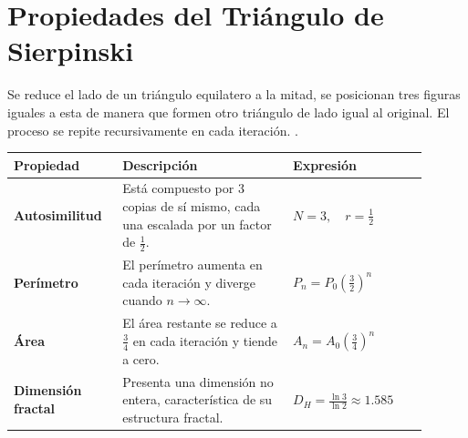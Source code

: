 \section{Propiedades del Triángulo de Sierpinski}

Se reduce el lado de un triángulo equilatero a la mitad, se posicionan tres figuras iguales a esta de manera que formen otro triángulo de lado igual al original. El proceso se repite recursivamente en cada iteración. \cite{Gustavo}.


\begin{center}
\renewcommand{\arraystretch}{1.5}
\begin{tabular}{p{0.22\linewidth} p{0.38\linewidth} p{0.30\linewidth}}
\hline
\textbf{Propiedad} & \textbf{Descripción} & \textbf{Expresión} \\
\hline

\textbf{Autosimilitud} &
Está compuesto por $3$ copias de sí mismo, cada una escalada por un factor de $\frac{1}{2}$. &
$N=3,\quad r=\frac{1}{2}$ \\

\textbf{Perímetro} &
El perímetro aumenta en cada iteración y diverge cuando $n\rightarrow\infty$. &
$P_n=P_0\left(\frac{3}{2}\right)^n$
\\[0.2cm]

\textbf{Área} &
El área restante se reduce a $\frac{3}{4}$ en cada iteración y tiende a cero. &
$A_n=A_0\left(\frac{3}{4}\right)^n$
\\[0.2cm]

\textbf{Dimensión fractal} &
Presenta una dimensión no entera, característica de su estructura fractal. &
$\displaystyle D_H=\frac{\ln 3}{\ln 2}\approx1.585$ \\

\hline

\end{tabular}
\end{center}


